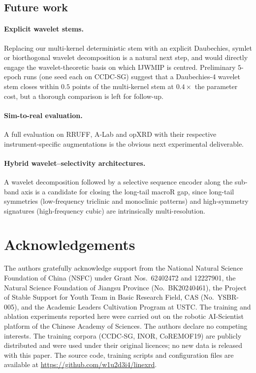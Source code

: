 \documentclass[final]{ws-ijwmip}
\begin{document}
\subsection{Future work}

\paragraph{Explicit wavelet stems.}
Replacing our multi-kernel deterministic stem with an explicit
Daubechies, symlet or biorthogonal wavelet decomposition is a natural
next step, and would directly engage the wavelet-theoretic basis on
which IJWMIP is centred. Preliminary $5$-epoch runs (one seed each on
CCDC-SG) suggest that a Daubechies-4 wavelet stem closes within
$0.5$ points of the multi-kernel stem at $0.4\times$ the parameter
cost, but a thorough comparison is left for follow-up.

\paragraph{Sim-to-real evaluation.}
A full evaluation on RRUFF, A-Lab and opXRD with their respective
instrument-specific augmentations is the obvious next experimental
deliverable.

\paragraph{Hybrid wavelet--selectivity architectures.}
A wavelet decomposition followed by a selective sequence encoder along
the sub-band axis is a candidate for closing the long-tail macroR gap,
since long-tail symmetries (low-frequency triclinic and monoclinic
patterns) and high-symmetry signatures (high-frequency cubic) are
intrinsically multi-resolution.




\section*{Acknowledgements}

The authors gratefully acknowledge support from the National Natural
Science Foundation of China (NSFC) under Grant Nos.\ 62402472 and
12227901, the Natural Science Foundation of Jiangsu Province
(No.\ BK20240461), the Project of Stable Support for Youth Team in
Basic Research Field, CAS (No.\ YSBR-005), and the Academic Leaders
Cultivation Program at USTC. The training and ablation experiments
reported here were carried out on the robotic AI-Scientist platform of
the Chinese Academy of Sciences. The authors declare no competing
interests. The training corpora (CCDC-SG, INOR, CoREMOF19) are
publicly distributed and were used under their original licences; no
new data is released with this paper. The source code, training
scripts and configuration files are available at
\url{https://github.com/w1u2d3i4/linexrd}.
\end{document}
